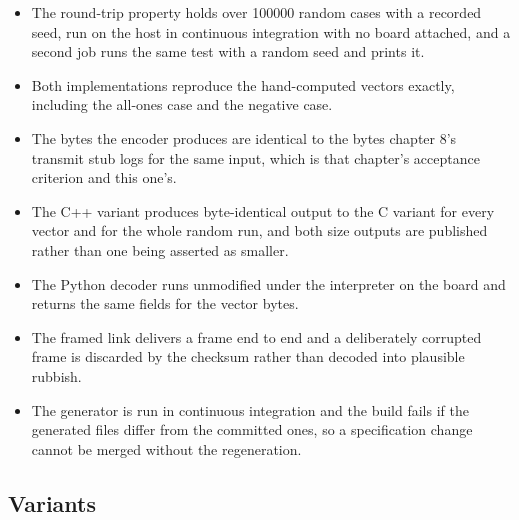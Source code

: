 \begin{itemize}
\item The round-trip property holds over 100000 random cases with a recorded
seed, run on the host in continuous integration with no board attached, and a
second job runs the same test with a random seed and prints it.
\item Both implementations reproduce the hand-computed vectors exactly,
including the all-ones case and the negative case.
\item The bytes the encoder produces are identical to the bytes chapter 8's
transmit stub logs for the same input, which is that chapter's acceptance
criterion and this one's.
\item The C++ variant produces byte-identical output to the C variant for every
vector and for the whole random run, and both size outputs are published rather
than one being asserted as smaller.
\item The Python decoder runs unmodified under the interpreter on the board and
returns the same fields for the vector bytes.
\item The framed link delivers a frame end to end and a deliberately corrupted
frame is discarded by the checksum rather than decoded into plausible rubbish.
\item The generator is run in continuous integration and the build fails if the
generated files differ from the committed ones, so a specification change cannot
be merged without the regeneration.
\end{itemize}

\subsection*{Variants}

